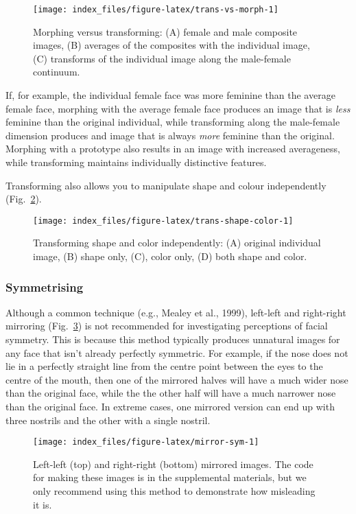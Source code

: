 \documentclass[
  doc,floatsintext]{apa6}
\begin{document}
\begin{figure}
\texttt{[image: index\_files/figure-latex/trans-vs-morph-1]} \caption{Morphing versus transforming: (A) female and male composite images, (B) averages of the composites with the individual image, (C) transforms of the individual image along the male-female continuum.}\label{fig:trans-vs-morph}
\end{figure}

If, for example, the individual female face was more feminine than the average female face, morphing with the average female face produces an image that is \emph{less} feminine than the original individual, while transforming along the male-female dimension produces and image that is always \emph{more} feminine than the original. Morphing with a prototype also results in an image with increased averageness, while transforming maintains individually distinctive features.

Transforming also allows you to manipulate shape and colour independently (Fig.~\ref{fig:trans-shape-color}).

\begin{figure}
\texttt{[image: index\_files/figure-latex/trans-shape-color-1]} \caption{Transforming shape and color independently: (A) original individual image, (B) shape only, (C), color only, (D) both shape and color.}\label{fig:trans-shape-color}
\end{figure}

\hypertarget{symmetrising}{%
\subsubsection{Symmetrising}\label{symmetrising}}

Although a common technique (e.g., Mealey et al., 1999), left-left and right-right mirroring (Fig.~\ref{fig:mirror-sym}) is not recommended for investigating perceptions of facial symmetry. This is because this method typically produces unnatural images for any face that isn't already perfectly symmetric. For example, if the nose does not lie in a perfectly straight line from the centre point between the eyes to the centre of the mouth, then one of the mirrored halves will have a much wider nose than the original face, while the the other half will have a much narrower nose than the original face. In extreme cases, one mirrored version can end up with three nostrils and the other with a single nostril.

\begin{figure}
\texttt{[image: index\_files/figure-latex/mirror-sym-1]} \caption{Left-left (top) and right-right (bottom) mirrored images. The code for making these images is in the supplemental materials, but we only recommend using this method to demonstrate how misleading it is.}\label{fig:mirror-sym}
\end{figure}
\end{document}
